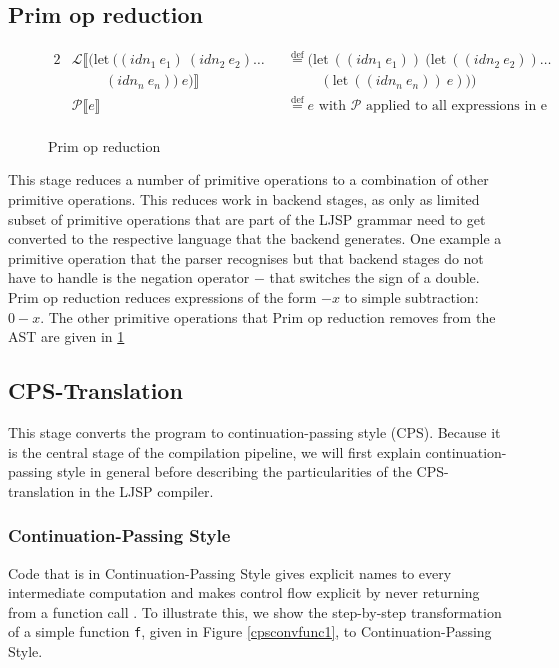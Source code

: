\documentclass[11pt]{report}
\newcommand{\eqdef}{\stackrel{\text{def}}{=}}%
\begin{document}
\subsection{Prim op reduction}
\begin{figure}[ht]
\begin{alignat*}{2}
&\mathcal{L}\llbracket (\text{let}\ ((idn_1\ e_1)\ (idn_2\ e_2)\dots &&\eqdef (\text{let}\ ((idn_1\ e_1))\ (\text{let}\ ((idn_2\ e_2)) \dots \\
&\hspace{1cm} (idn_n\ e_n))\ e)\rrbracket &&\hspace{1cm}(\text{let}\ ((idn_n\ e_n))\ e)))\\
&\mathcal{P}\llbracket e \rrbracket && \eqdef e\text{ with $\mathcal{P}$ applied to all expressions in e}\\
\end{alignat*}
\caption{Prim op reduction}
\label{primopreduction}
\end{figure}
This stage reduces a number of primitive operations to a combination of other primitive operations. This reduces work in backend stages, as only as limited subset of primitive operations that are part of the LJSP grammar need to get converted to the respective language that the backend generates. One example a primitive operation that the parser recognises but that backend stages do not have to handle is the negation operator $-$ that switches the sign of a double. Prim op reduction reduces expressions of the form $-x$ to simple subtraction: $0-x$. The other primitive operations that Prim op reduction removes from the AST are given in \ref{primopreduction}
\subsection{CPS-Translation}
This stage converts the program to continuation-passing style (CPS). Because it is the central stage of the compilation pipeline, we will first explain continuation-passing style in general before describing the particularities of the CPS-translation in the LJSP compiler.

\subsubsection{Continuation-Passing Style}
Code that is in Continuation-Passing Style gives explicit names to every intermediate computation and makes control flow explicit by never returning from a function call \cite{sysftal} \cite{appel}. To illustrate this, we show the step-by-step transformation of a simple function \texttt{f}, given in Figure \ref{cpsconvfunc1}, to Continuation-Passing Style.
\end{document}
